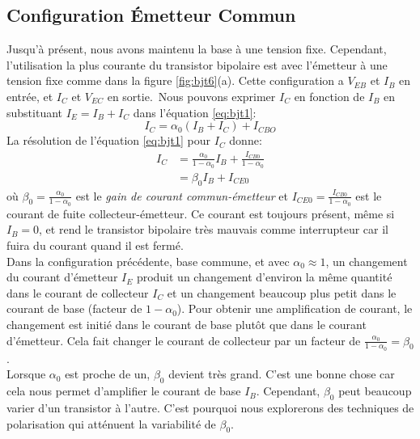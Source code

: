 \subsection{Configuration Émetteur Commun}
Jusqu'à présent, nous avons maintenu la base à une tension fixe. Cependant, l'utilisation la plus courante du transistor bipolaire est avec l'émetteur à une tension fixe comme dans la figure \ref{fig:bjt6}(a). Cette configuration a $V_{EB}$ et $I_B$ en entrée, et $I_C$ et $V_{EC}$ en sortie.\
Nous pouvons exprimer $I_C$ en fonction de $I_B$ en substituant $I_E = I_B + I_C$ dans l'équation \ref{eq:bjt1}:
$$
I_C = \alpha_0 (I_B + I_C) + I_{CBO}
$$
La résolution de l'équation \ref{eq:bjt1} pour $I_C$ donne:
\begin{equation}
    \begin{split}
        I_C &= \frac{\alpha_0}{1-\alpha_0} I_B + \frac{I_{CB0}}{1 - \alpha_0}\\
            &= \beta_0 I_B + I_{CE0}
        \label{eq:bjt2}
    \end{split}
\end{equation}
où $\beta_0 = \frac{\alpha_0}{1-\alpha_0}$ est le \emph{gain de courant commun-émetteur} et $I_{CE0} = \frac{I_{CB0}}{1-\alpha_0}$ est le courant de fuite collecteur-émetteur. Ce courant est toujours présent, même si $I_B = 0$, et rend le transistor bipolaire très mauvais comme interrupteur car il fuira du courant quand il est fermé.\\
Dans la configuration précédente, base commune, et avec $\alpha_0 \approx 1$, un changement du courant d'émetteur $I_E$ produit un changement d'environ la même quantité dans le courant de collecteur $I_C$ et un changement beaucoup plus petit dans le courant de base (facteur de $1-\alpha_0$). Pour obtenir une amplification de courant, le changement est initié dans le courant de base plutôt que dans le courant d'émetteur. Cela fait changer le courant de collecteur par un facteur de $\frac{\alpha_0}{1 - \alpha_0} = \beta_0$.\\
Lorsque $\alpha_0$ est proche de un, $\beta_0$ devient très grand. C'est une bonne chose car cela nous permet d'amplifier le courant de base $I_B$. Cependant, $\beta_0$ peut beaucoup varier d'un transistor à l'autre. C'est pourquoi nous explorerons des techniques de polarisation qui atténuent la variabilité de $\beta_0$.


